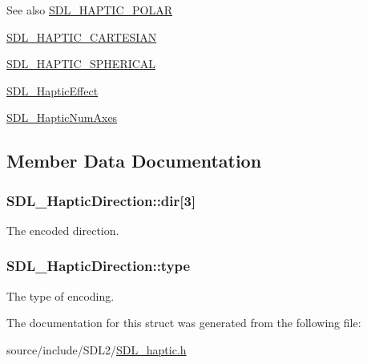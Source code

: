 \begin{DoxySeeAlso}{See also}
\hyperlink{_s_d_l__haptic_8h_acdc35e97e5525472054a67b76e518f3b}{S\+D\+L\+\_\+\+H\+A\+P\+T\+I\+C\+\_\+\+P\+O\+L\+A\+R} 

\hyperlink{_s_d_l__haptic_8h_af8b2430a363a968de2a5b64c8f663d3b}{S\+D\+L\+\_\+\+H\+A\+P\+T\+I\+C\+\_\+\+C\+A\+R\+T\+E\+S\+I\+A\+N} 

\hyperlink{_s_d_l__haptic_8h_a1fcf7cb0eaf3c39b16ba266054e25aff}{S\+D\+L\+\_\+\+H\+A\+P\+T\+I\+C\+\_\+\+S\+P\+H\+E\+R\+I\+C\+A\+L} 

\hyperlink{union_s_d_l___haptic_effect}{S\+D\+L\+\_\+\+Haptic\+Effect} 

\hyperlink{_s_d_l__haptic_8h_ad6705645197f6df4eeeea32392462483}{S\+D\+L\+\_\+\+Haptic\+Num\+Axes} 
\end{DoxySeeAlso}


\subsection{Member Data Documentation}
\hypertarget{struct_s_d_l___haptic_direction_a6cebd8118a3e61e36bd0c503ae020362}{}
\subsubsection[{dir}]{ S\+D\+L\+\_\+\+Haptic\+Direction\+::dir\mbox{[}3\mbox{]}}\label{struct_s_d_l___haptic_direction_a6cebd8118a3e61e36bd0c503ae020362}
The encoded direction. \hypertarget{struct_s_d_l___haptic_direction_acd6830ad68c4ba2af16057fa418087cc}{}
\subsubsection[{type}]{ S\+D\+L\+\_\+\+Haptic\+Direction\+::type}\label{struct_s_d_l___haptic_direction_acd6830ad68c4ba2af16057fa418087cc}
The type of encoding. 

The documentation for this struct was generated from the following file\+:\begin{DoxyCompactItemize}
\item 
source/include/\+S\+D\+L2/\hyperlink{_s_d_l__haptic_8h}{S\+D\+L\+\_\+haptic.\+h}\end{DoxyCompactItemize}
